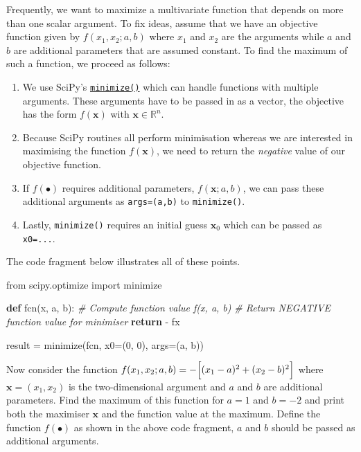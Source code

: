 \documentclass{scrartcl}
\providecommand{\tightlist}{%
      \setlength{\itemsep}{0pt}\setlength{\parskip}{0pt}}
\newenvironment{Shaded}{}{}
\newcommand{\KeywordTok}[1]{\textcolor[rgb]{0.00,0.44,0.13}{\textbf{{#1}}}}
\newcommand{\DecValTok}[1]{\textcolor[rgb]{0.25,0.63,0.44}{{#1}}}
\newcommand{\CommentTok}[1]{\textcolor[rgb]{0.38,0.63,0.69}{\textit{{#1}}}}
\newcommand{\NormalTok}[1]{{#1}}
\newcommand{\ImportTok}[1]{{#1}}
\newcommand{\ControlFlowTok}[1]{\textcolor[rgb]{0.00,0.44,0.13}{\textbf{{#1}}}}
\newcommand{\OperatorTok}[1]{\textcolor[rgb]{0.40,0.40,0.40}{{#1}}}
\begin{document}
Frequently, we want to maximize a multivariate function that depends on
more than one scalar argument. To fix ideas, assume that we have an
objective function given by \(f(x_1, x_2; a, b)\) where \(x_1\) and
\(x_2\) are the arguments while \(a\) and \(b\) are additional
parameters that are assumed constant. To find the maximum of such a
function, we proceed as follows:

\begin{enumerate}
\def\labelenumi{\arabic{enumi}.}
\tightlist
\item
  We use SciPy's
  \href{https://docs.scipy.org/doc/scipy/reference/generated/scipy.optimize.minimize.html}{\texttt{minimize()}}
  which can handle functions with multiple arguments. These arguments
  have to be passed in as a vector, \ie the objective has the form
  \(f(\mathbf{x})\) with \(\mathbf{x} \in \mathbb{R}^n\).
\item
  Because SciPy routines all perform minimisation whereas we are
  interested in maximising the function \(f(\mathbf{x})\), we need to
  return the \emph{negative} value of our objective function.
\item
  If \(f(\bullet)\) requires additional parameters, \eg
  \(f(\mathbf{x}; a, b)\), we can pass these additional arguments as
  \texttt{args=(a,b)} to \texttt{minimize()}.
\item
  Lastly, \texttt{minimize()} requires an initial guess \(\mathbf{x}_0\)
  which can be passed as \texttt{x0=...}.
\end{enumerate}

The code fragment below illustrates all of these points.

    \begin{Shaded}
\begin{Highlighting}[]
\ImportTok{from}\NormalTok{ scipy.optimize }\ImportTok{import}\NormalTok{ minimize}

\KeywordTok{def}\NormalTok{ fcn(x, a, b):}
    \CommentTok{\# Compute function value f(x, a, b)}
    \CommentTok{\# Return NEGATIVE function value for minimiser}
    \ControlFlowTok{return} \OperatorTok{{-}}\NormalTok{ fx}

\NormalTok{result }\OperatorTok{=}\NormalTok{ minimize(fcn, x0}\OperatorTok{=}\NormalTok{(}\DecValTok{0}\NormalTok{, }\DecValTok{0}\NormalTok{), args}\OperatorTok{=}\NormalTok{(a, b))}
\end{Highlighting}
\end{Shaded}

    Now consider the function
\(f(x_1, x_2; a,b) = - \Bigl[(x_1 - a)^2 + (x_2 - b)^2 \Bigr]\) where
\(\mathbf{x} = (x_1, x_2)\) is the two-dimensional argument and \(a\)
and \(b\) are additional parameters. Find the maximum of this function
for \(a=1\) and \(b=-2\) and print both the maximiser \(\mathbf{x}\) and
the function value at the maximum. Define the function \(f(\bullet)\) as
shown in the above code fragment, \ie \(a\) and \(b\) should be passed
as additional arguments.
\end{document}
